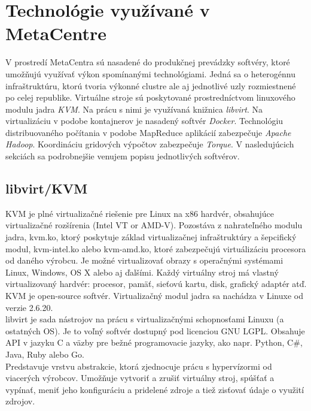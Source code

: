 \documentclass[12pt,twoside,color,cover,table]{fithesis3}
\begin{document}
\section{Technológie využívané v MetaCentre}
V prostredí MetaCentra sú nasadené do produkčnej prevádzky softvéry, ktoré umožňujú využívať výkon spomínanými technológiami. Jedná sa o heterogénnu infraštruktúru, ktorú tvoria výkonné clustre ale 
aj jednotlivé uzly rozmiestnené po celej republike. Virtuálne stroje sú poskytované prostredníctvom linuxového modulu jadra \textit{KVM}. Na prácu s nimi je využívaná knižnica \textit{libvirt}. 
Na virtualizáciu v podobe kontajnerov je nasadený softvér \textit{Docker}. Technológiu distribuovaného počítania v podobe MapReduce aplikácií zabezpečuje \textit{Apache Hadoop}.
Koordináciu gridových výpočtov zabezpečuje \textit{Torque}. V nasledujúcich sekciách sa podrobnejšie venujem popisu jednotlivých softvérov.
 
\subsection{libvirt/KVM}
KVM\footnotemark{} je plné virtualizačné riešenie pre Linux na x86 hardvér, obsahujúce virtualizačné rozšírenia (Intel VT or AMD-V).
Pozostáva z nahrateľného modulu jadra, kvm.ko, ktorý poskytuje základ virtualizačnej infraštruktúry a šepcifický modul, kvm-intel.ko alebo kvm-amd.ko, ktoré zabezpečujú virtuálizáciu procesora od daného výrobcu.
Je možné virtualizovať obrazy s operačnými systémami Linux, Windows, OS X alebo aj ďalšími. Každý virtuálny stroj má vlastný virtualizovaný hardvér: procesor, pamäť, sieťovú kartu, disk, grafický adaptér atď. 
KVM je open-source softvér. Virtualizačný modul jadra sa nachádza v Linuxe od verzie 2.6.20.%
\\libvirt je sada nástrojov na prácu s virtualizačnými schopnosťami Linuxu (a ostatných OS). Je to voľný softvér dostupný pod licenciou GNU LGPL. 
Obsahuje API v jazyku C a väzby pre bežné programovacie jazyky, ako napr. Python, C\#, Java, Ruby alebo Go.%
\\Predstavuje vrstvu abstrakcie, ktorá zjednocuje prácu s hypervízormi od viacerých výrobcov. Umožňuje vytvoriť a zrušiť virtuálny stroj, spúšťať a vypínať, meniť jeho konfiguráciu a pridelené zdroje a tiež zisťovať údaje o využití zdrojov.
\end{document}
